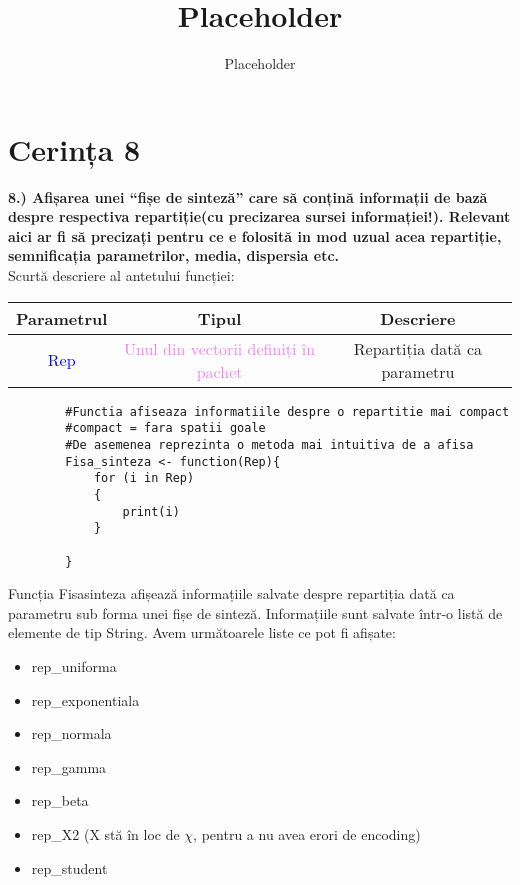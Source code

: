 \documentclass[12pt]{article}
\title{Placeholder}
\author{Placeholder}
\begin{document}
	\section{Cerința 8}
	\textbf{8.) Afișarea unei “fișe de sinteză” care să conțină informații de bază despre respectiva
		repartiție(cu precizarea sursei informației!). Relevant aici ar fi să precizați pentru ce e
		folosită in mod uzual acea repartiție, semnificația parametrilor, media, dispersia etc.}\vspace{5mm}\\
\indent Scurtă descriere al antetului funcției: \\
\begin{center}
	\begin{tabular}{|| c | c | c ||}
		\hline
		Parametrul & Tipul & Descriere \\
		\hline
		\textcolor{blue}{Rep}	 & \textcolor{violet}{Unul din vectorii definiți în pachet} & Repartiția dată ca parametru \\
		\hline
	\end{tabular}
\end{center}	
	\begin{lstlisting}
		#Functia afiseaza informatiile despre o repartitie mai compact
		#compact = fara spatii goale
		#De asemenea reprezinta o metoda mai intuitiva de a afisa
		Fisa_sinteza <- function(Rep){
			for (i in Rep)
			{
				print(i)
			}
			
		}
	\end{lstlisting}
	

Funcția Fisa\underline{\hspace{.08in}}sinteza afișează informațiile salvate despre repartiția dată ca parametru sub forma unei fișe de sinteză.\hfill \break
\indent Informațiile sunt salvate într-o listă de elemente de tip String. Avem următoarele liste ce pot fi afișate:
\begin{itemize}
	\item rep\_uniforma
	\item rep\_exponentiala
	\item rep\_normala
	\item rep\_gamma
	\item rep\_beta
	\item rep\_X2 (X stă în loc de $\chi$, pentru a nu avea erori de encoding)
	\item rep\_student
\end{itemize}
	
	
\end{document}
